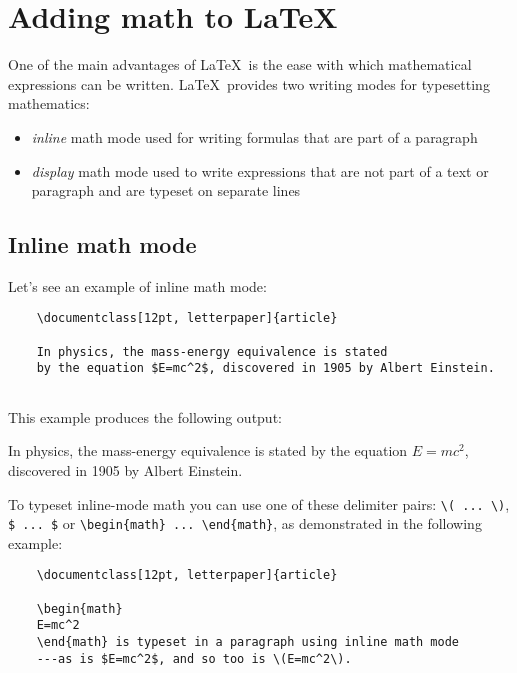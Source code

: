 \section{Adding math to \LaTeX}

One of the main advantages of \LaTeX\ is the ease with which mathematical expressions can be written. \LaTeX\ provides two writing modes for typesetting mathematics:

\begin{itemize}
    \item \emph{inline} math mode used for writing formulas that are part of a paragraph
    \item \emph{display} math mode used to write expressions that are not part of a text or paragraph and are typeset on separate lines
\end{itemize}

\subsection{Inline math mode}

Let’s see an example of inline math mode:

\begin{tcolorbox}
\begin{verbatim}
    \documentclass[12pt, letterpaper]{article}
    
    In physics, the mass-energy equivalence is stated 
    by the equation $E=mc^2$, discovered in 1905 by Albert Einstein.
    
\end{verbatim}
\end{tcolorbox}

This example produces the following output:

\begin{mdframed}
    \-\hspace{20pt}In physics, the mass-energy equivalence is stated by the equation $E=mc^2$, discovered in 1905 by Albert Einstein.
\end{mdframed}

To typeset inline-mode math you can use one of these delimiter pairs: \verb|\( ... \)|, \verb|$ ... $| or \verb|\begin{math} ... \end{math}|, as demonstrated in the following example:

\begin{tcolorbox}
\begin{verbatim}
    \documentclass[12pt, letterpaper]{article}
    
    \begin{math}
    E=mc^2
    \end{math} is typeset in a paragraph using inline math mode
    ---as is $E=mc^2$, and so too is \(E=mc^2\).
    
\end{verbatim}
\end{tcolorbox}

